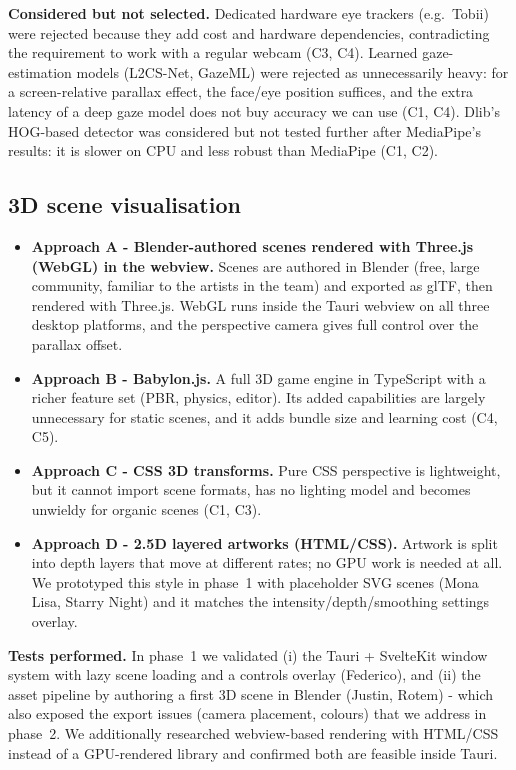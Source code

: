 \documentclass[11pt,a4paper]{article}
\begin{document}
\noindent\textbf{Considered but not selected.} Dedicated hardware eye trackers
(e.g.\ Tobii) were rejected because they add cost and hardware dependencies,
contradicting the requirement to work with a regular webcam (C3, C4).
Learned gaze-estimation models (L2CS-Net, GazeML) were rejected as unnecessarily
heavy: for a screen-relative parallax effect, the face/eye position suffices,
and the extra latency of a deep gaze model does not buy accuracy we can use
(C1, C4). Dlib's HOG-based detector was considered but not tested further
after MediaPipe's results: it is slower on CPU and less robust than MediaPipe
(C1, C2).

\subsection{3D scene visualisation}

\begin{itemize}[leftmargin=*,itemsep=1pt,topsep=2pt]
\item \textbf{Approach A - Blender-authored scenes rendered with Three.js
(WebGL) in the webview.} Scenes are authored in Blender (free, large community,
familiar to the artists in the team) and exported as glTF, then rendered with
Three.js. WebGL runs inside the Tauri webview on all three desktop platforms,
and the perspective camera gives full control over the parallax offset.
\item \textbf{Approach B - Babylon.js.} A full 3D game engine in TypeScript
with a richer feature set (PBR, physics, editor). Its added capabilities are
largely unnecessary for static scenes, and it adds bundle size and learning
cost (C4, C5).
\item \textbf{Approach C - CSS 3D transforms.} Pure CSS perspective is
lightweight, but it cannot import scene formats, has no lighting model and
becomes unwieldy for organic scenes (C1, C3).
\item \textbf{Approach D - 2.5D layered artworks (HTML/CSS).} Artwork is
split into depth layers that move at different rates; no GPU work is needed
at all. We prototyped this style in phase~1 with placeholder SVG scenes
(Mona Lisa, Starry Night) and it matches the intensity/depth/smoothing
settings overlay.
\end{itemize}

\noindent\textbf{Tests performed.} In phase~1 we validated (i) the Tauri +
SvelteKit window system with lazy scene loading and a controls overlay
(Federico), and (ii) the asset pipeline by authoring a first 3D scene in
Blender (Justin, Rotem) - which also exposed the export issues (camera
placement, colours) that we address in phase~2. We additionally
researched webview-based rendering with HTML/CSS instead of a GPU-rendered
library and confirmed both are feasible inside Tauri.
\end{document}
